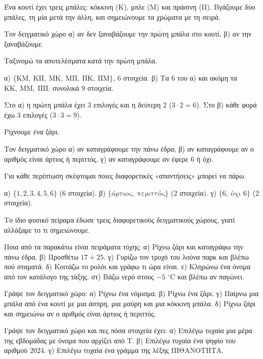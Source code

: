 \tixero Ένα κουτί έχει τρεις μπάλες: κόκκινη (Κ), μπλε (Μ) και πράσινη (Π). Βγάζουμε δύο μπάλες, τη μία μετά την άλλη, και σημειώνουμε τα χρώματα με τη σειρά.\par
\tithelo Τον δειγματικό χώρο α) αν δεν ξαναβάζουμε την πρώτη μπάλα στο κουτί, β) αν την ξαναβάζουμε.\par
\possindeo Ταξινομώ τα αποτελέσματα κατά την πρώτη μπάλα.\par
\apantisi α) $\{\mathrm{ΚΜ},\ \mathrm{ΚΠ},\ \mathrm{ΜΚ},\ \mathrm{ΜΠ},\ \mathrm{ΠΚ},\ \mathrm{ΠΜ}\}$, $6$ στοιχεία. β) Τα $6$ του α) και ακόμη τα $\mathrm{ΚΚ},\ \mathrm{ΜΜ},\ \mathrm{ΠΠ}$: συνολικά $9$ στοιχεία.\par
\elegxos Στο α) η πρώτη μπάλα έχει $3$ επιλογές και η δεύτερη $2$ ($3\cdot2=6$). Στο β) κάθε φορά έχω $3$ επιλογές ($3\cdot3=9$).

\tixero Ρίχνουμε ένα ζάρι.\par
\tithelo Τον δειγματικό χώρο α) αν καταγράφουμε την πάνω έδρα, β) αν καταγράφουμε αν ο αριθμός είναι άρτιος ή περιττός, γ) αν καταγράφουμε αν έφερε $6$ ή όχι.\par
\possindeo Για κάθε περίπτωση σκέφτομαι ποιες διαφορετικές «απαντήσεις» μπορεί να πάρω.\par
\apantisi α) $\{1,2,3,4,5,6\}$ ($6$ στοιχεία). β) $\{\text{άρτιος},\ \text{περιττός}\}$ ($2$ στοιχεία). γ) $\{6,\ \text{όχι }6\}$ ($2$ στοιχεία).\par
\elegxos Το ίδιο φυσικό πείραμα έδωσε τρεις διαφορετικούς δειγματικούς χώρους, γιατί αλλάξαμε το τι σημειώνουμε.



\ex Ποια από τα παρακάτω είναι πειράματα τύχης; α) Ρίχνω ζάρι και καταγράφω την πάνω έδρα. β) Προσθέτω $17+25$. γ) Γυρίζω τον τροχό του λούνα παρκ και βλέπω πού σταματά. δ) Κοιτάζω το ρολόι και γράφω τι ώρα είναι. ε) Κληρώνω ένα όνομα από τον κατάλογο της τάξης. στ) Βάζω νερό στους $-5$ $^\circ$C και βλέπω αν παγώνει.

\ex Γράψε τον δειγματικό χώρο: α) Ρίχνω ένα νόμισμα. β) Ρίχνω ένα ζάρι. γ) Παίρνω μια μπάλα από ένα κουτί με μια άσπρη, μια μαύρη και μια κόκκινη μπάλα. δ) Ρίχνω ζάρι και σημειώνω αν ο αριθμός είναι άρτιος ή περιττός.

\ex Γράψε τον δειγματικό χώρο και πες πόσα στοιχεία έχει: α) Επιλέγω τυχαία μια μέρα της εβδομάδας με όνομα που αρχίζει από Τ. β) Επιλέγω τυχαία ένα ψηφίο του αριθμού $2024$. γ) Επιλέγω τυχαία ένα γράμμα της λέξης ΠΙΘΑΝΟΤΗΤΑ.

